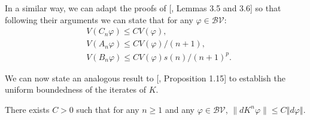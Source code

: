 \documentclass{ws-sd}
\newcommand{\norm}[1]{\left\Vert #1\right\Vert}
\begin{document}
In a similar way, we can adapt the proofs of [, Lemmas 3.5 and 3.6]  so that following their arguments we can state that for any $\varphi \in \mathcal{BV}$:
\begin{align}
    &V(C_n\varphi)\le CV(\varphi), \label{bound_Cn}\\
    &V(A_n\varphi) \le CV(\varphi)/(n+1), \label{bound_An}\\
    &V(B_n\varphi) \le CV(\varphi)s(n)/(n+1)^p. \label{bound_Bn}
\end{align}

We can now state an analogous result to [, Proposition 1.15] to establish the uniform boundedness of the iterates of $K$.
\begin{proposition}\label{analogue1.15}
    There exists $C > 0$ such that for any $n \ge 1$ and any $\varphi \in \mathcal{BV}$,
   $\lVert dK^n\varphi\rVert \le C\norm{d\varphi}$.
\end{proposition}
\end{document}

